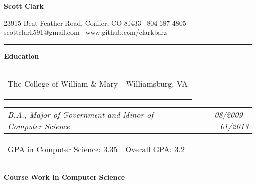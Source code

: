 \documentclass[11pt]{article}
\makeatletter
\newcommand{\headerrow}[2]
{\begin{tabular*}{\linewidth}{l@{\extracolsep{\fill}}r}
	#1 &
	#2 \\
\end{tabular*}}
\makeatother
\begin{document}
\begin{center}
	\begin{huge}
		\bf Scott Clark
	\end{huge}
	
	\large 23915 Bent Feather Road, Conifer, CO 80433 \textbullet\ 804 687 4805 \\
	\large scottclark591@gmail.com \textbullet\ www.github.com/clarkbarz \\
\end{center}


\vspace{-0.5em}
\hrule
\vspace{0.5em}

\begin{LARGE}\bf{Education}\end{LARGE} \begin{Large}
	
\end{Large}

\vspace{0.4em}

\headerrow
	{\begin{Large}The College of William \& Mary\end{Large}}
	{Williamsburg, VA}
\headerrow
	{\textit{B.A., Major of Government and Minor of Computer Science}} 
	{\textit{08/2009 - 01/2013}}
\headerrow
	{GPA in Computer Science: 3.35}
	{Overall GPA: 3.2}

\vspace{0.2em}
\hrule
\vspace{0.7em}

\begin{LARGE}
	\bf Course Work in Computer Science
\end{LARGE}

\vspace{-0.4em}
\end{document}
